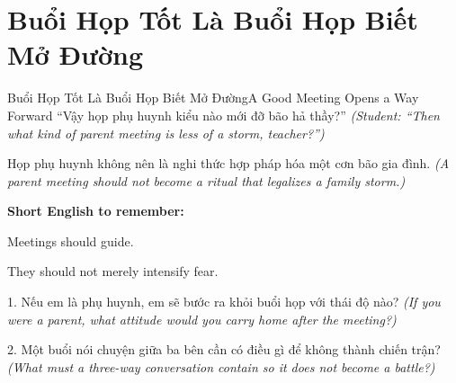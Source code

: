 \section{Buổi Họp Tốt Là Buổi Họp Biết Mở Đường}
\begin{truyen}{Buổi Họp Tốt Là Buổi Họp Biết Mở Đường}{A Good Meeting Opens a Way Forward}
 ``Vậy họp phụ huynh kiểu nào mới đỡ bão hả thầy?''
\textit{(Student: ``Then what kind of parent meeting is less of a storm, teacher?'')}

\end{truyen}

\begin{baihoc}
Họp phụ huynh không nên là nghi thức hợp pháp hóa một cơn bão gia đình.
\textit{(A parent meeting should not become a ritual that legalizes a family storm.)}
\end{baihoc}

\begin{ghinhoanh}
\textbf{Short English to remember:}

Meetings should guide.

They should not merely intensify fear.
\end{ghinhoanh}

\begin{tuhocnhanh}
1. Nếu em là phụ huynh, em sẽ bước ra khỏi buổi họp với thái độ nào? \textit{(If you were a parent, what attitude would you carry home after the meeting?)}

2. Một buổi nói chuyện giữa ba bên cần có điều gì để không thành chiến trận? \textit{(What must a three-way conversation contain so it does not become a battle?)}
\end{tuhocnhanh}

\ngancach

